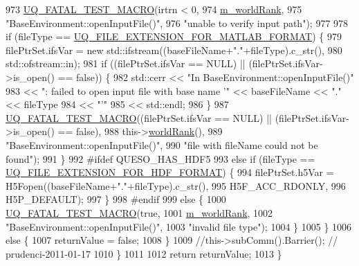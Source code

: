 \begin{DoxyCode}
973       \hyperlink{_defines_8h_a56d63d18d0a6d45757de47fcc06f574d}{UQ\_FATAL\_TEST\_MACRO}(irtrn < 0,
974                           \hyperlink{class_q_u_e_s_o_1_1_base_environment_a464cab923ada0e14c6e3a4000c2ea385}{m\_worldRank},
975                           \textcolor{stringliteral}{"BaseEnvironment::openInputFile()"},
976                           \textcolor{stringliteral}{"unable to verify input path"});
977 
978       \textcolor{keywordflow}{if} (fileType == \hyperlink{_defines_8h_ac440026eff7deb1c1eed1eea0e8e36ba}{UQ\_FILE\_EXTENSION\_FOR\_MATLAB\_FORMAT}) \{
979         filePtrSet.ifsVar = \textcolor{keyword}{new} std::ifstream((baseFileName+\textcolor{stringliteral}{"."}+fileType).c\_str(),
980                                               std::ofstream::in);
981         \textcolor{keywordflow}{if} ((filePtrSet.ifsVar == NULL) || (filePtrSet.ifsVar->is\_open() == \textcolor{keyword}{false})) \{
982           std::cerr << \textcolor{stringliteral}{"In BaseEnvironment::openInputFile()"}
983                     << \textcolor{stringliteral}{": failed to open input file with base name '"} << baseFileName << \textcolor{stringliteral}{"."} << fileType
984                     << \textcolor{stringliteral}{"'"}
985                     << std::endl;
986         \}
987         \hyperlink{_defines_8h_a56d63d18d0a6d45757de47fcc06f574d}{UQ\_FATAL\_TEST\_MACRO}((filePtrSet.ifsVar == NULL) || (filePtrSet.ifsVar->is\_open()
       == \textcolor{keyword}{false}),
988                             this->\hyperlink{class_q_u_e_s_o_1_1_base_environment_a78b57112bbd0e6dd0e8afec00b40ffa7}{worldRank}(),
989                             \textcolor{stringliteral}{"BaseEnvironment::openInputFile()"},
990                             \textcolor{stringliteral}{"file with fileName could not be found"});
991       \}
992 \textcolor{preprocessor}{#ifdef QUESO\_HAS\_HDF5}
993 \textcolor{preprocessor}{}      \textcolor{keywordflow}{else} \textcolor{keywordflow}{if} (fileType == \hyperlink{_defines_8h_a4ebcc075277d031eb97c90b9a45f4493}{UQ\_FILE\_EXTENSION\_FOR\_HDF\_FORMAT}) \{
994         filePtrSet.h5Var = H5Fopen((baseFileName+\textcolor{stringliteral}{"."}+fileType).c\_str(),
995                                    H5F\_ACC\_RDONLY,
996                                    H5P\_DEFAULT);
997       \}
998 \textcolor{preprocessor}{#endif}
999 \textcolor{preprocessor}{}      \textcolor{keywordflow}{else} \{
1000         \hyperlink{_defines_8h_a56d63d18d0a6d45757de47fcc06f574d}{UQ\_FATAL\_TEST\_MACRO}(\textcolor{keyword}{true},
1001                             \hyperlink{class_q_u_e_s_o_1_1_base_environment_a464cab923ada0e14c6e3a4000c2ea385}{m\_worldRank},
1002                             \textcolor{stringliteral}{"BaseEnvironment::openInputFile()"},
1003                             \textcolor{stringliteral}{"invalid file type"});
1004       \}
1005     \}
1006     \textcolor{keywordflow}{else} \{
1007       returnValue = \textcolor{keyword}{false};
1008     \}
1009     \textcolor{comment}{//this->subComm().Barrier(); // prudenci-2011-01-17}
1010   \}
1011 
1012   \textcolor{keywordflow}{return} returnValue;
1013 \}
\end{DoxyCode}
